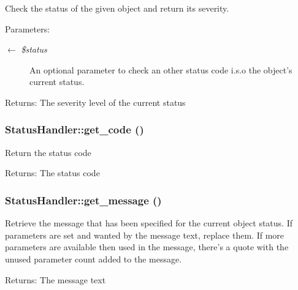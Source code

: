 Check the status of the given object and return its severity.

\begin{Desc}
\item[Parameters:]
\begin{description}
\item[\mbox{$\leftarrow$} {\em \$status}]An optional parameter to check an other status code i.s.o the object's current status. \end{description}
\end{Desc}
\begin{Desc}
\item[Returns:]The severity level of the current status \end{Desc}
\hypertarget{classStatusHandler_d39bc4e6a56b6d418a252957da9b4417}{
\subsubsection{\setlength{\rightskip}{0pt plus 5cm}StatusHandler::get\_\-code ()}}
\label{classStatusHandler_d39bc4e6a56b6d418a252957da9b4417}


Return the status code

\begin{Desc}
\item[Returns:]The status code \end{Desc}
\hypertarget{classStatusHandler_79170bca79bfd82e3f707e1294e7c916}{
\subsubsection{\setlength{\rightskip}{0pt plus 5cm}StatusHandler::get\_\-message ()}}
\label{classStatusHandler_79170bca79bfd82e3f707e1294e7c916}


Retrieve the message that has been specified for the current object status. If parameters are set and wanted by the message text, replace them. If more parameters are available then used in the message, there's a quote with the unused parameter count added to the message.

\begin{Desc}
\item[Returns:]The message text \end{Desc}


